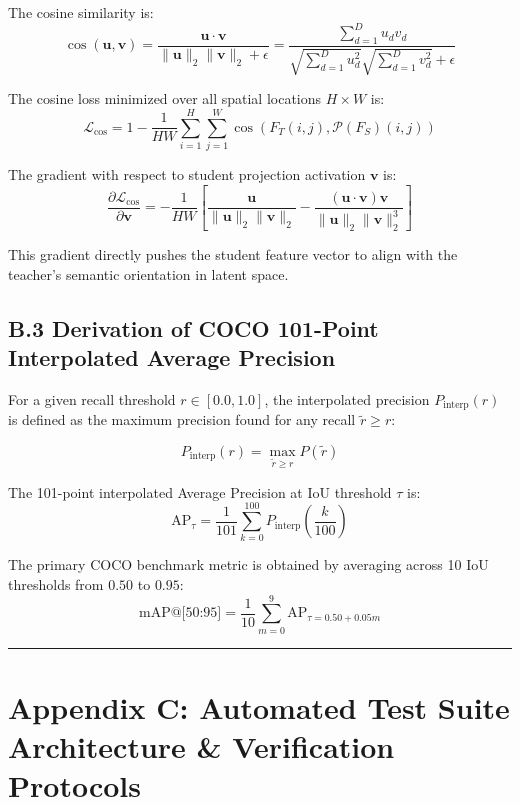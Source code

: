 The cosine similarity is:
\[\cos(\mathbf{u}, \mathbf{v}) = \frac{\mathbf{u} \cdot \mathbf{v}}{\|\mathbf{u}\|_2 \|\mathbf{v}\|_2 + \epsilon} = \frac{\sum_{d=1}^D u_d v_d}{\sqrt{\sum_{d=1}^D u_d^2} \sqrt{\sum_{d=1}^D v_d^2} + \epsilon}\]

The cosine loss minimized over all spatial locations \(H \times W\) is:
\[\mathcal{L}_{\text{cos}} = 1 - \frac{1}{HW} \sum_{i=1}^H \sum_{j=1}^W \cos(F_T(i, j), \mathcal{P}(F_S)(i, j))\]

The gradient with respect to student projection activation
\(\mathbf{v}\) is:
\[\frac{\partial \mathcal{L}_{\text{cos}}}{\partial \mathbf{v}} = -\frac{1}{HW} \left[ \frac{\mathbf{u}}{\|\mathbf{u}\|_2 \|\mathbf{v}\|_2} - \frac{(\mathbf{u} \cdot \mathbf{v}) \mathbf{v}}{\|\mathbf{u}\|_2 \|\mathbf{v}\|_2^3} \right]\]

This gradient directly pushes the student feature vector to align with
the teacher's semantic orientation in latent space.

\subsection{B.3 Derivation of COCO 101-Point Interpolated Average
Precision}\label{b.3-derivation-of-coco-101-point-interpolated-average-precision}

For a given recall threshold \(r \in [0.0, 1.0]\), the interpolated
precision \(P_{\text{interp}}(r)\) is defined as the maximum precision
found for any recall \(\tilde{r} \ge r\):

\[P_{\text{interp}}(r) = \max_{\tilde{r} \ge r} P(\tilde{r})\]

The 101-point interpolated Average Precision at IoU threshold \(\tau\)
is:
\[\text{AP}_{\tau} = \frac{1}{101} \sum_{k=0}^{100} P_{\text{interp}}\left(\frac{k}{100}\right)\]

The primary COCO benchmark metric is obtained by averaging across 10 IoU
thresholds from \(0.50\) to \(0.95\):
\[\text{mAP@[50:95]} = \frac{1}{10} \sum_{m=0}^9 \text{AP}_{\tau = 0.50 + 0.05m}\]

\begin{center}\rule{0.5\linewidth}{0.5pt}\end{center}

\section{Appendix C: Automated Test Suite Architecture \& Verification
Protocols}\label{appendix-c-automated-test-suite-architecture-verification-protocols}

